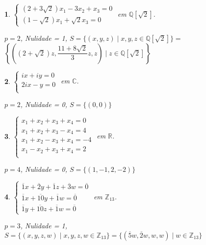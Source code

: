 \documentclass[12pt]{exam}
\newtheorem{exercicio}{}
\newcommand{\integer}{\mathbb{Z}}
\newcommand{\rac}{\mathbb{Q}}
\newcommand{\real}{\mathbb{R}}
\newcommand{\complex}{\mathbb{C}}
\begin{document}
\begin{exercicio}
$\begin{cases}
  (2 + 3\sqrt{2})x_1 - 3x_2 + x_3 = 0\\
  (1 - \sqrt{2})x_1 + \sqrt{2}x_3 = 0
\end{cases}$ em $\rac[\sqrt{2}]$.
\begin{solucao}
  $p = 2$, Nulidade = 1, $S = \{(x, y, z) \mid x, y, z \in \rac[\sqrt{2}]\} = $ \\ $\left\{\left((2 + \sqrt{2})z, \dfrac{11 + 8\sqrt{2}}{3}z, z\right) \mid z \in \rac[\sqrt{2}]\right\}$
\end{solucao}
\end{exercicio}

\begin{exercicio}
$\begin{cases}
  ix + iy = 0\\
  2ix - y = 0\\
\end{cases}$ em $\complex$.
\begin{solucao}
  $p = 2$, Nulidade = 0, $S = \{(0, 0)\}$
\end{solucao}
\end{exercicio}

\begin{exercicio}
$\begin{cases}
  x_1 + x_2 + x_3 + x_4 = 0\\
  x_1 + x_2 + x_3 - x_4 = 4\\
  x_1 + x_2 - x_3 + x_4 = -4\\
  x_1 - x_2 + x_3 + x_4 = 2\\
\end{cases}$ em $\real$.
\begin{solucao}
  $p = 4$, Nulidade = 0, $S = \{(1, -1, 2, -2)\}$
\end{solucao}
\end{exercicio}

\begin{exercicio}
$\begin{cases}
  \overline{1}x + \overline{2}y + \overline{1}z + \overline{3}w = \overline{0}\\
  \overline{1}x + \overline{10}y + \overline{1}w = \overline{0}\\
  \overline{1}y + \overline{10}z + \overline{1}w = \overline{0}
\end{cases}$ em $\integer_{13}$.
\begin{solucao}
  $p = 3$, Nulidade = 1, $S = \{(x, y, z, w) \mid x, y, z, w \in \integer_{13}\} = \{(\overline{5}w, \overline{2}w,w, w) \mid w \in \integer_{13}\}$
\end{solucao}
\end{exercicio}
\end{document}
